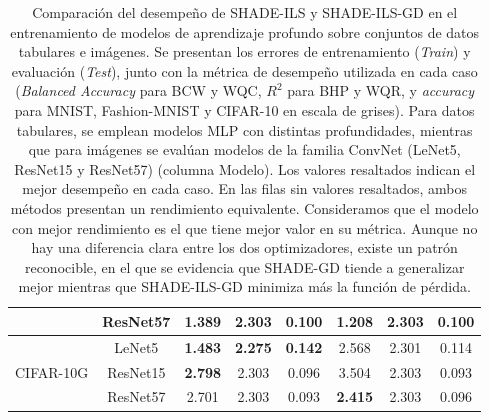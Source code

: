 \begin{table}[tbp]
{\begin{tabular}{|c|c|ccc|ccc|}
                                   & ResNet57                         & \multicolumn{1}{c|}{1.389}          & \multicolumn{1}{c|}{2.303}          & 0.100                    & \multicolumn{1}{c|}{\textbf{1.208}}  & \multicolumn{1}{c|}{2.303}           & 0.100                             \\ \hline
\multirow{3}{*}{CIFAR-10G}        & LeNet5                           & \multicolumn{1}{c|}{\textbf{1.483}} & \multicolumn{1}{c|}{\textbf{2.275}} & \textbf{0.142}           & \multicolumn{1}{c|}{2.568}           & \multicolumn{1}{c|}{2.301}           & 0.114                             \\ \cline{2-8} 
                                   & ResNet15                         & \multicolumn{1}{c|}{\textbf{2.798}} & \multicolumn{1}{c|}{2.303}          & 0.096                    & \multicolumn{1}{c|}{3.504}           & \multicolumn{1}{c|}{2.303}           & 0.093                             \\ \cline{2-8} 
                                   & ResNet57                         & \multicolumn{1}{c|}{2.701}          & \multicolumn{1}{c|}{2.303}          & 0.093                    & \multicolumn{1}{c|}{\textbf{2.415}}  & \multicolumn{1}{c|}{2.303}           & 0.096                             \\ \hline
\end{tabular}}
\caption[Comparación del desempeño de SHADE-GD y SHADE-ILS-GD en el entrenamiento de modelos de aprendizaje profundo sobre conjuntos de datos tabulares e imágenes]{Comparación del desempeño de SHADE-ILS y SHADE-ILS-GD en el entrenamiento de modelos de aprendizaje profundo sobre conjuntos de datos tabulares e imágenes. Se presentan los errores de entrenamiento (\textit{Train}) y evaluación (\textit{Test}), junto con la métrica de desempeño utilizada en cada caso (\textit{Balanced Accuracy} para BCW y WQC, $R^2$  para BHP y WQR, y \textit{accuracy} para MNIST, Fashion-MNIST y CIFAR-10 en escala de grises). Para datos tabulares, se emplean modelos MLP con distintas profundidades, mientras que para imágenes se evalúan modelos de la familia ConvNet (LeNet5, ResNet15 y ResNet57)  (columna Modelo). Los valores resaltados indican el mejor desempeño en cada caso. En las filas sin valores resaltados, ambos métodos presentan un rendimiento equivalente. Consideramos que el modelo con mejor rendimiento es el que tiene mejor valor en su métrica. Aunque no hay una diferencia clara entre los dos optimizadores, existe un patrón reconocible, en el que se evidencia que SHADE-GD tiende a generalizar mejor mientras que SHADE-ILS-GD minimiza más la función de pérdida.}
\label{tab:shadegdvsilsgd}
\end{table}

